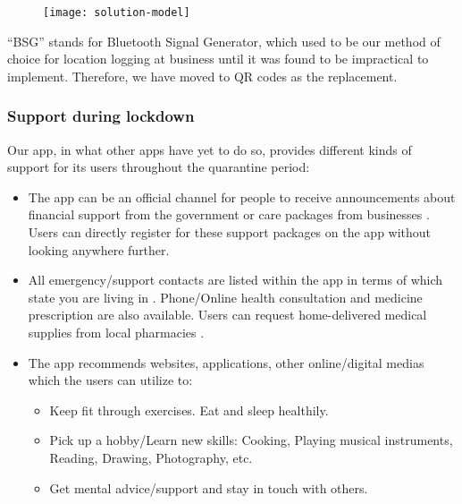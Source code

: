   \begin{figure}[H]
    \centering
    \texttt{[image: solution-model]}
  \end{figure}

  \par ``BSG'' stands for Bluetooth Signal Generator, which used to be our method of choice for location logging at business until it was found to be impractical to implement. Therefore, we have moved to QR codes as the replacement.

  \subsubsection{Support during lockdown}
  \par Our app, in what other apps have yet to do so, provides different kinds of support for its users throughout the quarantine period:
  \begin{itemize}
    \item The app can be an official channel for people to receive announcements about financial support from the government \parencite{Support5} or care packages from businesses \parencite{Support1}. Users can directly register for these support packages on the app without looking anywhere further.
    \item All emergency/support contacts are listed within the app in terms of which state you are living in \parencite{Support1} \parencite{Support2} \parencite{Support4}. Phone/Online health consultation and medicine prescription are also available. Users can request home-delivered medical supplies from local pharmacies \parencite{Support2}.
    \item The app recommends websites, applications, other online/digital medias which the users can utilize to: \parencite{Support3} \parencite{Support4}
      \begin{itemize}
        \item Keep fit through exercises. Eat and sleep healthily.
        \item Pick up a hobby/Learn new skills: Cooking, Playing musical instruments, Reading, Drawing, Photography, etc.
        \item Get mental advice/support and stay in touch with others.
      \end{itemize}
  \end{itemize}

